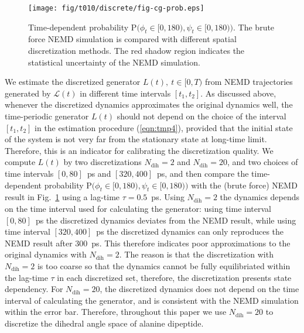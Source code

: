 \documentclass[aps, pre, preprint,unsortedaddress,a4paper,onecolumn,showkeys]{revtex4}
\newcommand{\recheck}[1]{{\color{red} #1}}
\newcommand{\ml}[0]{\mathcal {L}}
\newcommand{\prob}{\textrm{P}}
\newcommand{\dih}{\textrm{dih}}
\begin{document}
%



\begin{figure}
  \centering
  \texttt{[image: fig/t010/discrete/fig-cg-prob.eps]}  
  \caption{Time-dependent probability $\prob\big(\phi_t\in[0,180), \psi_t\in [0,180)\big)$.  The brute force NEMD simulation is compared with different
    spatial discretization methods. The red shadow region indicates the
    statistical uncertainty of the NEMD simulation.}
  \label{fig:tmp2}
\end{figure}

We estimate the discretized generator $L(t), \ t\in[0,T)$
from NEMD trajectories generated by $\ml(t)$ in different time intervals $[t_1,
t_2]$.
As discussed above, whenever  the discretized dynamics approximates the original
dynamics well, the time-periodic generator $L(t)$ should not depend on the choice of the interval $[t_1,t_2]$ in the estimation procedure (\ref{eqn:tmp4}), provided that the initial state of the system
is not very far from the stationary state at long-time limit.
Therefore, this is an indicator for calibrating the discretization quality.
We compute $L(t)$ by two discretizations $N_\dih=2$ and $N_\dih=20$, and two
choices of time intervals $[0, 80]$~ps and $[320, 400]$~ps, and then
compare the time-dependent probability $\prob\big(\phi_t\in[0,180), \psi_t\in [0,180)\big)$
with the (brute force) NEMD result in Fig.~\ref{fig:tmp2} using a lag-time $\tau=0.5$~ps.
Using $N_\dih=2$ the dynamics depends on the time interval used for
calculating the generator: using time interval $[0, 80]$~ps the discretized
dynamics deviates from the NEMD result,
while using time interval $[320, 400]$~ps the discretized dynamics can only
reproduces the NEMD result after 300~ps.  This therefore indicates poor 
approximations to the original dynamics with $N_\dih=2$. The reason is that the
discretization with $N_\dih=2$ is too coarse so that the dynamics cannot be fully
equilibriated within the lag-time $\tau$ in each discretized set,
therefore, the discretization presents state dependency.  For
$N_\dih=20$, the discretized dynamics does not depend on the time interval of
calculating the generator, and is consistent with the
NEMD simulation within the error bar. Therefore, throughout this paper we use $N_\dih=20$
to discretize  the dihedral angle space of alanine dipeptide.
\end{document}
